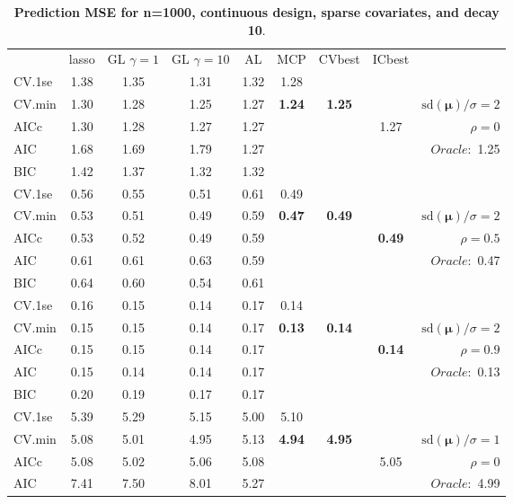 \clearpage
\begin{table}\vspace{-.5cm}
\caption[l]{ { \bf Prediction MSE for n=1000, continuous design, 
sparse covariates, and  decay  10}.}
\vspace{-.5cm}
\footnotesize{}
\begin{center}
\begin{tabular}{l*{7}{c}|r}
 & lasso & GL $\gamma=1$ & GL $\gamma=10$ & AL & MCP  & CVbest & ICbest  \\
\cline{1-9}
CV.1se & 1.38 & 1.35 & 1.31 & 1.32 & 1.28 & & & \\
CV.min & 1.30 & 1.28 & 1.25 & 1.27 & {\bf 1.24} & {\bf 1.25} & & $\mathrm{sd}(\mathbf{\mu})/\sigma=2$ \\
AICc & 1.30 & 1.28 & 1.27 & 1.27 & & & 1.27 &  $\rho=0$ \\
AIC & 1.68 & 1.69 & 1.79 & 1.27 & & & &  \multirow{2}{*}{$Oracle: $ 1.25} \\
BIC & 1.42 & 1.37 & 1.32 & 1.32 & & & &  \\
 \hline 
CV.1se & 0.56 & 0.55 & 0.51 & 0.61 & 0.49 & & & \\
CV.min & 0.53 & 0.51 & 0.49 & 0.59 & {\bf 0.47} & {\bf 0.49} & & $\mathrm{sd}(\mathbf{\mu})/\sigma=2$ \\
AICc & 0.53 & 0.52 & 0.49 & 0.59 & & & {\bf 0.49} &  $\rho=0.5$ \\
AIC & 0.61 & 0.61 & 0.63 & 0.59 & & & &  \multirow{2}{*}{$Oracle: $ 0.47} \\
BIC & 0.64 & 0.60 & 0.54 & 0.61 & & & &  \\
 \hline 
CV.1se & 0.16 & 0.15 & 0.14 & 0.17 & 0.14 & & & \\
CV.min & 0.15 & 0.15 & 0.14 & 0.17 & {\bf 0.13} & {\bf 0.14} & & $\mathrm{sd}(\mathbf{\mu})/\sigma=2$ \\
AICc & 0.15 & 0.15 & 0.14 & 0.17 & & & {\bf 0.14} &  $\rho=0.9$ \\
AIC & 0.15 & 0.14 & 0.14 & 0.17 & & & &  \multirow{2}{*}{$Oracle: $ 0.13} \\
BIC & 0.20 & 0.19 & 0.17 & 0.17 & & & &  \\
 \hline 
CV.1se & 5.39 & 5.29 & 5.15 & 5.00 & 5.10 & & & \\
CV.min & 5.08 & 5.01 & 4.95 & 5.13 & {\bf 4.94} & {\bf 4.95} & & $\mathrm{sd}(\mathbf{\mu})/\sigma=1$ \\
AICc & 5.08 & 5.02 & 5.06 & 5.08 & & & 5.05 &  $\rho=0$ \\
AIC & 7.41 & 7.50 & 8.01 & 5.27 & & & &  \multirow{2}{*}{$Oracle: $ 4.99} \\

\end{tabular}
\end{center}
\end{table}
